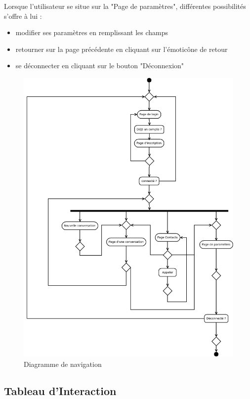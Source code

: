 	Lorsque l'utilisateur se situe sur la "Page de paramètres", différentes possibilités s'offre à lui :
	\begin{itemize}
		\item modifier ses paramètres en remplissant les champs
		\item retourner sur la page précédente en cliquant sur l’émoticône de retour
		\item se déconnecter en cliquant sur le bouton "Déconnexion"\\
	\end{itemize}

	\begin{figure}[H]
		\centerline{\includegraphics[width=16.5cm]{img/navigation.png}}
		\caption{Diagramme de navigation}
	\end{figure}


	\subsection{Tableau d’Interaction}
	
